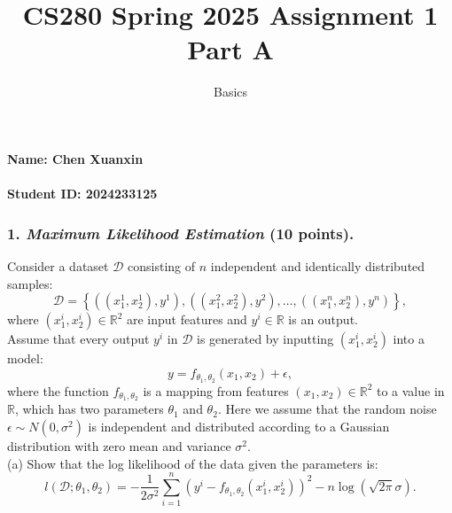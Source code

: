 \documentclass[12pt]{article}%
\begin{document}
\title{CS280 Spring 2025 Assignment 1 \\ Part A}
\author{Basics}
\maketitle

\paragraph{Name: Chen Xuanxin}

\paragraph{Student ID: 2024233125}

\newpage

\subsubsection*{1. \textit{Maximum Likelihood Estimation} (10 points).}
Consider a dataset $\mathcal{D}$ consisting of $n$ independent and identically distributed samples:
\begin{equation}
    \mathcal{D} = \left\{ ((x^1_1, x^1_2), y^1), ((x^2_1, x^2_2), y^2), \ldots, ((x^n_1, x^n_2), y^n) \right\},
    \tag{1}
\end{equation}
where $(x^i_1, x^i_2) \in \mathbb{R}^2$ are input features and $y^i \in \mathbb{R}$ is an output. 
\\
Assume that every output $y^i$ in $\mathcal{D}$ is generated by inputting $(x^i_1, x^i_2)$ into a model:
\begin{equation}
    y = f_{\theta_1,\theta_2}(x_1, x_2) + \epsilon,
    \tag{2}
\end{equation}
where the function $f_{\theta_1,\theta_2}$ is a mapping from features $(x_1, x_2) \in \mathbb{R}^2$ to a value in $\mathbb{R}$, which has two parameters $\theta_1$ and $\theta_2$. Here we assume that the random noise $\epsilon \sim N(0,\sigma^2)$ is independent and distributed according to a Gaussian distribution with zero mean and variance $\sigma^2$.
\vspace{1em}
\\
(a) Show that the log likelihood of the data given the parameters is:
\begin{equation}
    l(\mathcal{D};\theta_1,\theta_2) = -\frac{1}{2\sigma^2}\sum_{i=1}^{n}(y^i-f_{\theta_1,\theta_2}(x^i_1,x^i_2))^2-n\log(\sqrt{2\pi}\sigma).
    \tag{3}
\end{equation}
\end{document}
